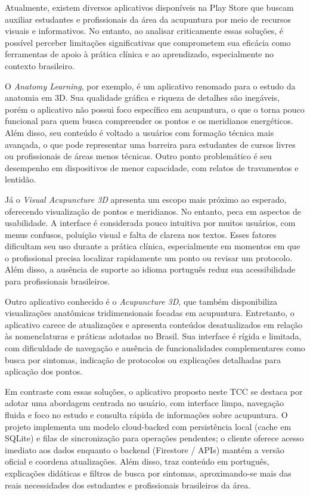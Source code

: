 Atualmente, existem diversos aplicativos disponíveis na Play Store que buscam auxiliar estudantes e profissionais da área da acupuntura por meio de recursos visuais e informativos. No entanto, ao analisar criticamente essas soluções, é possível perceber limitações significativas que comprometem sua eficácia como ferramentas de apoio à prática clínica e ao aprendizado, especialmente no contexto brasileiro.

O \textit{Anatomy Learning}, por exemplo, é um aplicativo renomado para o estudo da anatomia em 3D. Sua qualidade gráfica e riqueza de detalhes são inegáveis, porém o aplicativo não possui foco específico em acupuntura, o que o torna pouco funcional para quem busca compreender os pontos e os meridianos energéticos. Além disso, seu conteúdo é voltado a usuários com formação técnica mais avançada, o que pode representar uma barreira para estudantes de cursos livres ou profissionais de áreas menos técnicas. Outro ponto problemático é seu desempenho em dispositivos de menor capacidade, com relatos de travamentos e lentidão.

Já o \textit{Visual Acupuncture 3D} apresenta um escopo mais próximo ao esperado, oferecendo visualização de pontos e meridianos. No entanto, peca em aspectos de usabilidade. A interface é considerada pouco intuitiva por muitos usuários, com menus confusos, poluição visual e falta de clareza nos textos. Esses fatores dificultam seu uso durante a prática clínica, especialmente em momentos em que o profissional precisa localizar rapidamente um ponto ou revisar um protocolo. Além disso, a ausência de suporte ao idioma português reduz sua acessibilidade para profissionais brasileiros.

Outro aplicativo conhecido é o \textit{Acupuncture 3D}, que também disponibiliza visualizações anatômicas tridimensionais focadas em acupuntura. Entretanto, o aplicativo carece de atualizações e apresenta conteúdos desatualizados em relação às nomenclaturas e práticas adotadas no Brasil. Sua interface é rígida e limitada, com dificuldade de navegação e ausência de funcionalidades complementares como busca por sintomas, indicação de protocolos ou explicações detalhadas para aplicação dos pontos.

Em contraste com essas soluções, o aplicativo proposto neste TCC se destaca por adotar uma abordagem centrada no usuário, com interface limpa, navegação fluida e foco no estudo e consulta rápida de informações sobre acupuntura. O projeto implementa um modelo cloud-backed com persistência local (cache em SQLite) e filas de sincronização para operações pendentes; o cliente oferece acesso imediato aos dados enquanto o backend (Firestore / APIs) mantém a versão oficial e coordena atualizações. Além disso, traz conteúdo em português, explicações didáticas e filtros de busca por sintomas, aproximando-se mais das reais necessidades dos estudantes e profissionais brasileiros da área.

